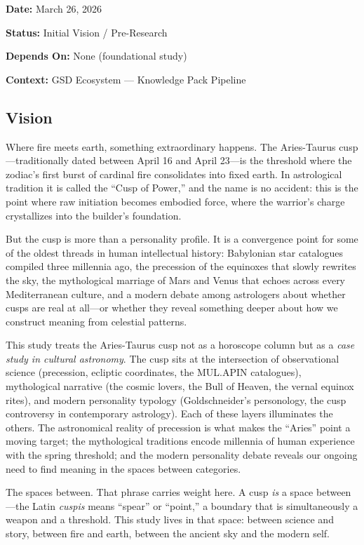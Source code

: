 \documentclass[11pt,letterpaper]{article}
\newcommand{\metafield}[2]{\textbf{\sffamily #1} #2\par}
\begin{document}
\metafield{Date:}{March 26, 2026}
\metafield{Status:}{Initial Vision / Pre-Research}
\metafield{Depends On:}{None (foundational study)}
\metafield{Context:}{GSD Ecosystem --- Knowledge Pack Pipeline}

\subsection{Vision}

Where fire meets earth, something extraordinary happens. The Aries-Taurus cusp---traditionally dated between April 16 and April 23---is the threshold where the zodiac's first burst of cardinal fire consolidates into fixed earth. In astrological tradition it is called the ``Cusp of Power,'' and the name is no accident: this is the point where raw initiation becomes embodied force, where the warrior's charge crystallizes into the builder's foundation.

But the cusp is more than a personality profile. It is a convergence point for some of the oldest threads in human intellectual history: Babylonian star catalogues compiled three millennia ago, the precession of the equinoxes that slowly rewrites the sky, the mythological marriage of Mars and Venus that echoes across every Mediterranean culture, and a modern debate among astrologers about whether cusps are real at all---or whether they reveal something deeper about how we construct meaning from celestial patterns.

This study treats the Aries-Taurus cusp not as a horoscope column but as a \textit{case study in cultural astronomy}. The cusp sits at the intersection of observational science (precession, ecliptic coordinates, the MUL.APIN catalogues), mythological narrative (the cosmic lovers, the Bull of Heaven, the vernal equinox rites), and modern personality typology (Goldschneider's personology, the cusp controversy in contemporary astrology). Each of these layers illuminates the others. The astronomical reality of precession is what makes the ``Aries'' point a moving target; the mythological traditions encode millennia of human experience with the spring threshold; and the modern personality debate reveals our ongoing need to find meaning in the spaces between categories.

The spaces between. That phrase carries weight here. A cusp \textit{is} a space between---the Latin \textit{cuspis} means ``spear'' or ``point,'' a boundary that is simultaneously a weapon and a threshold. This study lives in that space: between science and story, between fire and earth, between the ancient sky and the modern self.
\end{document}
